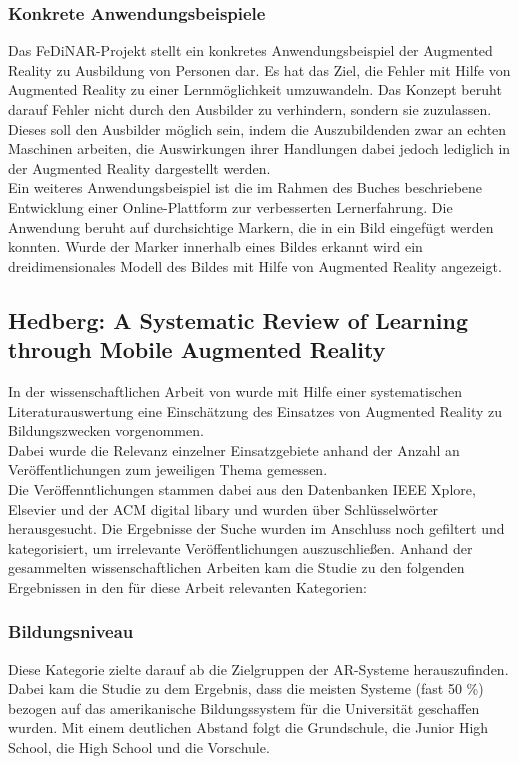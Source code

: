 \subsubsection{Konkrete Anwendungsbeispiele}
Das FeDiNAR-Projekt stellt ein konkretes Anwendungsbeispiel der Augmented Reality zu Ausbildung von Personen dar. Es hat das Ziel, die Fehler mit Hilfe von Augmented Reality zu einer Lernmöglichkeit umzuwandeln. Das Konzept beruht darauf Fehler nicht durch den Ausbilder zu verhindern, sondern sie zuzulassen. Dieses soll den Ausbilder möglich sein, indem die Auszubildenden zwar an echten Maschinen arbeiten, die Auswirkungen ihrer Handlungen dabei jedoch lediglich in der Augmented Reality dargestellt werden. 
\citep[Kapitel 5]{geroimenko:ar-in-education}\\
Ein weiteres Anwendungsbeispiel ist die im Rahmen des Buches beschriebene Entwicklung einer Online-Plattform zur verbesserten Lernerfahrung. Die Anwendung beruht auf \glqq durchsichtige\grqq{} Markern, die in ein Bild eingefügt werden konnten. Wurde der Marker innerhalb eines Bildes erkannt wird ein dreidimensionales Modell des Bildes mit Hilfe von Augmented Reality angezeigt. \citep[Kapitel 3]{geroimenko:ar-in-education}

\subsection{Hedberg: A Systematic Review of Learning through Mobile Augmented Reality}
In der wissenschaftlichen Arbeit von \citeauthor{hedberg:review-ar-learning} \citep{hedberg:review-ar-learning} wurde mit Hilfe einer systematischen Literaturauswertung eine Einschätzung des Einsatzes von Augmented Reality zu Bildungszwecken vorgenommen. \\
Dabei wurde die Relevanz einzelner Einsatzgebiete anhand der Anzahl an Veröffentlichungen zum jeweiligen Thema gemessen.\\ Die Veröffenntlichungen stammen dabei aus den Datenbanken \glqq IEEE Xplore\grqq , \glqq Elsevier\grqq{} und der \glqq ACM digital libary\grqq{} und wurden über Schlüsselwörter herausgesucht. Die Ergebnisse der Suche wurden im Anschluss noch gefiltert und kategorisiert, um irrelevante Veröffentlichungen auszuschließen.
Anhand der gesammelten wissenschaftlichen Arbeiten kam die Studie zu den folgenden Ergebnissen in den für diese Arbeit relevanten Kategorien:

\subsubsection{Bildungsniveau}
Diese Kategorie zielte darauf ab die Zielgruppen der AR-Systeme herauszufinden. Dabei kam die Studie zu dem Ergebnis, dass die meisten Systeme (fast 50 \%) bezogen auf das amerikanische Bildungssystem für die Universität geschaffen wurden. Mit einem deutlichen Abstand folgt die Grundschule, die Junior High School, die High School und die Vorschule. \citep[S. 78]{hedberg:review-ar-learning}

